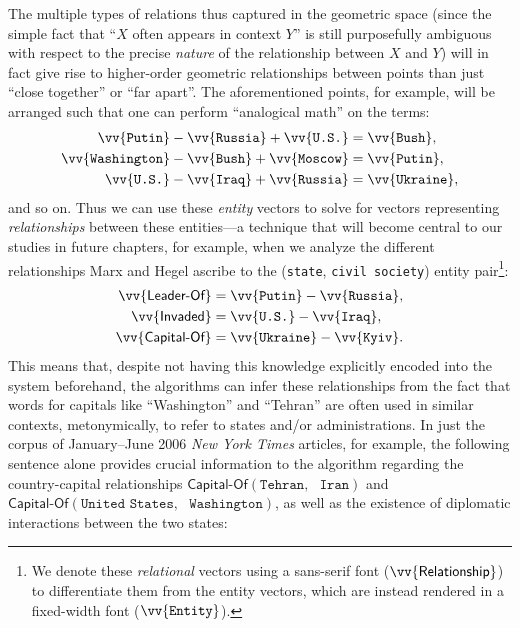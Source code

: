\documentclass[11pt]{article}
\newcommand{\entity}[1]{\texttt{#1}}
\begin{document}
The multiple types of relations thus captured in the geometric space (since the simple fact that ``$X$ often appears in context $Y$'' is still purposefully ambiguous with respect to the precise \textit{nature} of the relationship between $X$ and $Y$) will in fact give rise to higher-order geometric relationships between points than just ``close together'' or ``far apart''. The aforementioned points, for example, will be arranged such that one can perform ``analogical math'' on the terms:
\begin{align}
	\vv{\texttt{Putin}} - \vv{\texttt{Russia}} + \vv{\texttt{U.S.}} &= \vv{\texttt{Bush}}, \\
	\vv{\texttt{Washington}} - \vv{\texttt{Bush}} + \vv{\texttt{Moscow}} &= \vv{\texttt{Putin}}, \\
	\vv{\texttt{U.S.}} - \vv{\texttt{Iraq}} + \vv{\texttt{Russia}} &= \vv{\texttt{Ukraine}},
\end{align}
and so on. Thus we can use these \textit{entity} vectors to solve for vectors representing \textit{relationships} between these entities---a technique that will become central to our studies in future chapters, for example, when we analyze the different relationships Marx and Hegel ascribe to the (\entity{state}, \entity{civil society}) entity pair\footnote{We denote these \textit{relational} vectors using a sans-serif font ($\vv{\textsf{Relationship}}$) to differentiate them from the entity vectors, which are instead rendered in a fixed-width font ($\vv{\texttt{Entity}}$).}:
\begin{align}
	\vv{\textsf{Leader-Of}} &= \vv{\texttt{Putin}} - \vv{\texttt{Russia}}, \\
	\vv{\textsf{Invaded}} &= \vv{\texttt{U.S.}} - \vv{\texttt{Iraq}}, \\
	\vv{\textsf{Capital-Of}} &= \vv{\texttt{Ukraine}} - \vv{\texttt{Kyiv}}.
\end{align}
This means that, despite not having this knowledge explicitly encoded into the system beforehand, the algorithms can infer these relationships from the fact that words for capitals like ``Washington'' and ``Tehran'' are often used in similar contexts, metonymically, to refer to states and/or administrations. In just the corpus of January--June 2006 \textit{New York Times} articles, for example, the following sentence alone provides crucial information to the algorithm regarding the country-capital relationships $\textsf{Capital-Of}(\texttt{Tehran},\text{ }\texttt{Iran})$ and $\textsf{Capital-Of}(\entity{United States},\text{ }\entity{Washington})$, as well as the existence of diplomatic interactions between the two states:
\end{document}
